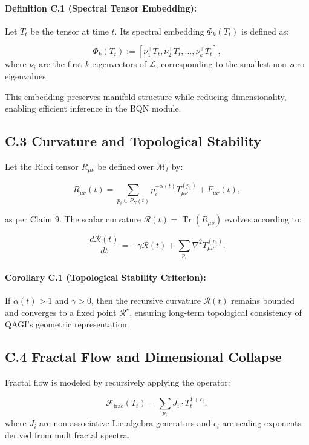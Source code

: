 \paragraph{Definition C.1 (Spectral Tensor Embedding):}
Let \(T_t\) be the tensor at time \(t\). Its spectral embedding \(\Phi_k(T_t)\) is defined as:

\[
\Phi_k(T_t) := \left[ \nu_1^\top T_t, \nu_2^\top T_t, \dots, \nu_k^\top T_t \right],
\]
where \(\nu_i\) are the first \(k\) eigenvectors of \(\mathcal{L}\), corresponding to the smallest non-zero eigenvalues.

This embedding preserves manifold structure while reducing dimensionality, enabling efficient inference in the BQN module.

\subsection*{C.3 Curvature and Topological Stability}

Let the Ricci tensor \(R_{\mu\nu}\) be defined over \(\mathcal{M}_t\) by:

\[
R_{\mu\nu}(t) = \sum_{p_i \in P_N(t)} p_i^{-\alpha(t)} T_{\mu\nu}^{(p_i)} + F_{\mu\nu}(t),
\]

as per Claim 9. The scalar curvature \(\mathcal{R}(t) = \operatorname{Tr}(R_{\mu\nu})\) evolves according to:

\[
\frac{d\mathcal{R}(t)}{dt} = - \gamma \mathcal{R}(t) + \sum_{p_i} \nabla^2 T_{\mu\nu}^{(p_i)}.
\]

\paragraph{Corollary C.1 (Topological Stability Criterion):}
If \(\alpha(t) > 1\) and \(\gamma > 0\), then the recursive curvature \(\mathcal{R}(t)\) remains bounded and converges to a fixed point \(\mathcal{R}^\star\), ensuring long-term topological consistency of QAGI’s geometric representation.

\subsection*{C.4 Fractal Flow and Dimensional Collapse}

Fractal flow is modeled by recursively applying the operator:

\[
\mathcal{F}_{\text{frac}}(T_t) = \sum_{p_i} J_i \cdot T_t^{1 + \epsilon_i},
\]
where \(J_i\) are non-associative Lie algebra generators and \(\epsilon_i\) are scaling exponents derived from multifractal spectra.

